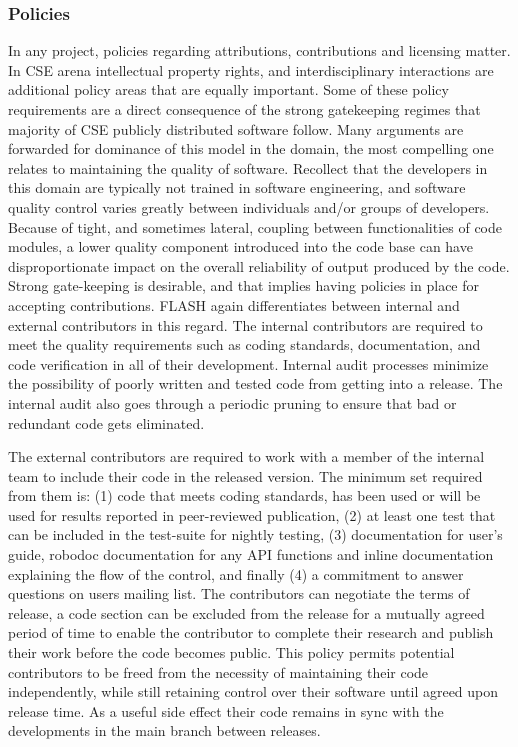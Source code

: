 \subsubsection{Policies}
\label{sec:FLASHPolicies}
In any project, policies regarding attributions, contributions and
licensing matter. In CSE arena intellectual property rights,
and interdisciplinary interactions are additional policy
areas that are equally important. Some of these policy requirements
are a direct consequence of the strong gatekeeping regimes that
majority of CSE publicly distributed software follow.  Many arguments
are forwarded for dominance of this model in the domain, the
most compelling one relates to maintaining the quality of
software. Recollect that the developers in this domain are typically
not trained in software engineering, and software quality control
varies greatly between individuals and/or groups of
developers. Because of tight, and sometimes lateral, coupling between
functionalities of code modules, a lower quality component introduced
into the code base can have disproportionate impact on the overall
reliability of output produced by the code. Strong gate-keeping is
desirable, and that implies having policies in place for accepting
contributions. FLASH again differentiates between internal and
external contributors in this regard. The internal contributors are
required to meet the quality requirements such as coding standards,
documentation, and code verification in all of their
development. Internal audit processes minimize the possibility of
poorly written and tested code from getting into a release. The internal audit also goes
through a periodic pruning to ensure that bad or redundant code gets
eliminated.  

The external contributors are required to work with a member of the
internal team to include their code in the released version. The
minimum set required from them is:  (1) code that meets coding standards,
has been used or will be used for results reported in peer-reviewed
publication, (2) at least one test that can be included in the
test-suite for nightly testing, (3) documentation for user's guide,
robodoc documentation for any API functions and inline documentation
explaining the flow of the control, and finally (4) a commitment to answer
questions on users mailing list. The contributors can negotiate the
terms of release, a code section can be excluded from the release for
a mutually agreed period of time to enable the contributor to complete
their research and publish their work before the code becomes
public. This policy permits potential contributors to be freed
from the necessity of maintaining their code independently, while
still retaining control over their software until agreed upon
release time.  As a useful side effect their code remains in sync with
the developments in the main branch between releases.  


